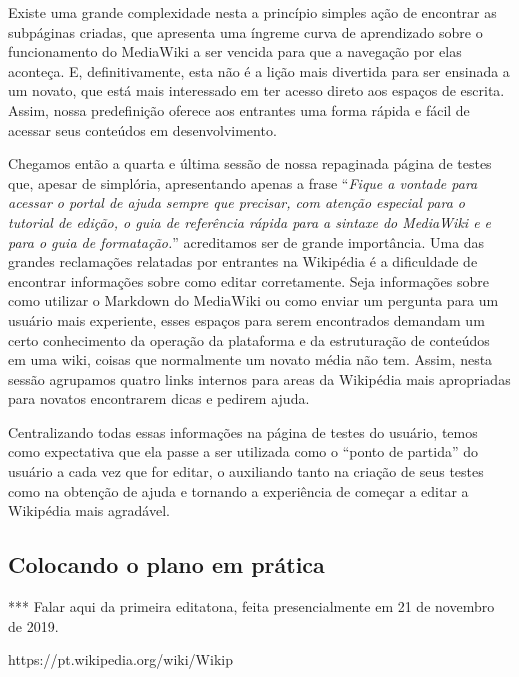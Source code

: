 Existe uma grande complexidade nesta a princípio simples ação de encontrar as subpáginas criadas, que apresenta uma íngreme curva de aprendizado sobre o funcionamento do MediaWiki a ser vencida para que a navegação por elas aconteça. E, definitivamente, esta não é a lição mais divertida para ser ensinada a um novato, que está mais interessado em ter acesso direto aos espaços de escrita. Assim, nossa predefinição oferece aos entrantes uma forma rápida e fácil de acessar seus conteúdos em desenvolvimento.

Chegamos então a quarta e última sessão de nossa repaginada página de testes que, apesar de simplória, apresentando apenas a frase ``\textit{Fique a vontade para acessar o portal de ajuda sempre que precisar, com atenção especial para o tutorial de edição, o guia de referência rápida para a sintaxe do MediaWiki e e para o guia de formatação.}'' acreditamos ser de grande importância. Uma das grandes reclamações relatadas por entrantes na Wikipédia é a dificuldade de encontrar informações sobre como editar corretamente. Seja informações sobre como utilizar o Markdown do MediaWiki ou como enviar um pergunta para um usuário mais experiente, esses espaços para serem encontrados demandam um certo conhecimento da operação da plataforma e da estruturação de conteúdos em uma wiki, coisas que normalmente um novato média não tem. Assim, nesta sessão agrupamos quatro links internos para areas da Wikipédia mais apropriadas para novatos encontrarem dicas e pedirem ajuda.

Centralizando todas essas informações na página de testes do usuário, temos como expectativa que ela passe a ser utilizada como o ``ponto de partida'' do usuário a cada vez que for editar, o auxiliando tanto na criação de seus testes como na obtenção de ajuda e tornando a experiência de começar a editar a Wikipédia mais agradável.

\subsection{Colocando o plano em prática}

***  Falar aqui da primeira editatona, feita presencialmente em 21 de novembro de 2019.

https://pt.wikipedia.org/wiki/Wikip%

